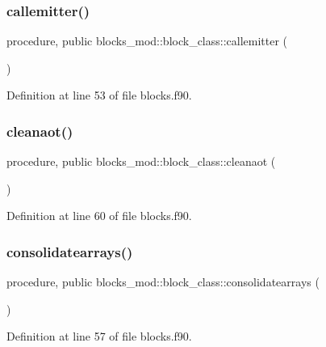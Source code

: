 \subsubsection{\texorpdfstring{callemitter()}{callemitter()}}
{\footnotesize\ttfamily procedure, public blocks\+\_\+mod\+::block\+\_\+class\+::callemitter (\begin{DoxyParamCaption}{ }\end{DoxyParamCaption})}



Definition at line 53 of file blocks.\+f90.

\mbox{\label{structblocks__mod_1_1block__class_ab58da434b2813d158b3f688d3c60d02c}} 
\subsubsection{\texorpdfstring{cleanaot()}{cleanaot()}}
{\footnotesize\ttfamily procedure, public blocks\+\_\+mod\+::block\+\_\+class\+::cleanaot (\begin{DoxyParamCaption}{ }\end{DoxyParamCaption})}



Definition at line 60 of file blocks.\+f90.

\mbox{\label{structblocks__mod_1_1block__class_a68f5bb0cb32b5b51cffd66d472cc45f0}} 
\subsubsection{\texorpdfstring{consolidatearrays()}{consolidatearrays()}}
{\footnotesize\ttfamily procedure, public blocks\+\_\+mod\+::block\+\_\+class\+::consolidatearrays (\begin{DoxyParamCaption}{ }\end{DoxyParamCaption})}



Definition at line 57 of file blocks.\+f90.

